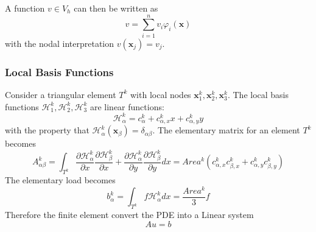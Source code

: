 \documentclass[11pt]{article}
\begin{document}
A function $v\in V_h$ can then be written as
\begin{equation}
    v =\sum_{i=1}^n v_i\varphi_i(\mathbf{x})
\end{equation}
with the nodal interpretation $v(\mathbf{x}_j) = v_j$.
\subsubsection{Local Basis Functions}
Consider a triangular element $T^k$ with local nodes $\mathbf{x}_1^k,\mathbf{x}_2^k,\mathbf{x}_3^k$. The local basis functions $\mathcal{H}_1^k,\mathcal{H}_2^k,\mathcal{H}_3^k$ are linear functions:
\begin{equation}
    \mathcal{H}_\alpha^k = c_\alpha^k + c_{\alpha,x}^kx + c_{\alpha,y}^ky 
\end{equation}
with the property that $\mathcal{H}_\alpha^k(\mathbf{x}_\beta) = \delta_{\alpha\beta}$.
The elementary matrix for an element $T^k$ becomes 
\begin{equation}
    A^k_{\alpha\beta} = \int_{T^k} \frac{\partial \mathcal H^k_\alpha}{\partial x}\frac{\partial \mathcal H^k_\beta}{\partial x} + \frac{\partial  \mathcal H^k_\alpha}{\partial y}\frac{\partial \mathcal H^k_\beta}{\partial y} dx = Area^k( c_{\alpha,x}^kc_{\beta,x}^k + c_{\alpha,y}^kc_{\beta,y}^k)
\end{equation}
The elementary load becomes
\begin{equation}
b_{\alpha}^k = \int_{T^k} f \mathcal H_\alpha^k dx
= \frac{Area^k}{3} f
\end{equation}
Therefore the finite element convert the PDE into a Linear system
\begin{equation}
    A u = b
\end{equation}
\end{document}
